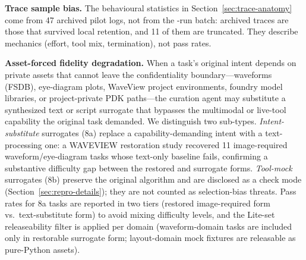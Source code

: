\textbf{Trace sample bias.} The behavioural statistics in Section~\ref{sec:trace-anatomy} come from 47 archived pilot logs, not from the \Neval{}-run batch: archived traces are those that survived local retention, and 11 of them are truncated. They describe mechanics (effort, tool mix, termination), not pass rates.

\textbf{Asset-forced fidelity degradation.} When a task's original intent depends on private assets that cannot leave the confidentiality boundary---waveforms (FSDB), eye-diagram plots, WaveView project environments, foundry model libraries, or project-private PDK paths---the curation agent may substitute a synthesized text or script surrogate that bypasses the multimodal or live-tool capability the original task demanded. We distinguish two sub-types. \emph{Intent-substitute} surrogates (8a) replace a capability-demanding intent with a text-processing one: a WAVEVIEW restoration study recovered 11 image-required waveform/eye-diagram tasks whose text-only baseline fails, confirming a substantive difficulty gap between the restored and surrogate forms. \emph{Tool-mock} surrogates (8b) preserve the original algorithm and are disclosed as a check mode (Section~\ref{sec:repro-details}); they are not counted as selection-bias threats. Pass rates for 8a tasks are reported in two tiers (restored image-required form vs.\ text-substitute form) to avoid mixing difficulty levels, and the Lite-set releaseability filter is applied per domain (waveform-domain tasks are included only in restorable surrogate form; layout-domain mock fixtures are releasable as pure-Python assets).


